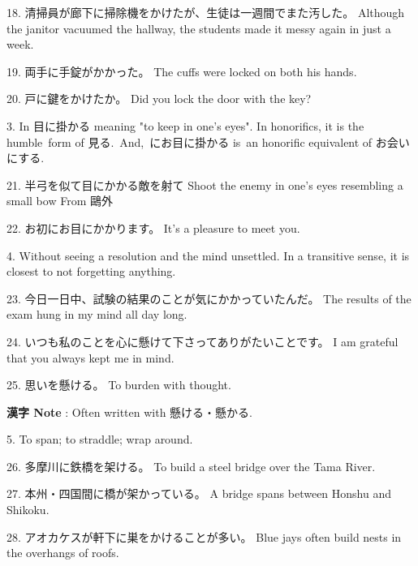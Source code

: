 \par{18. 清掃員が廊下に掃除機をかけたが、生徒は一週間でまた汚した。 \hfill\break
Although the janitor vacuumed the hallway, the students made it messy again in just a week. }

\par{19. 両手に手錠がかかった。 \hfill\break
The cuffs were locked on both his hands. }

\par{20. 戸に鍵をかけたか。 \hfill\break
Did you lock the door with the key? }

\par{3. In 目に掛かる meaning "to keep in one's eyes". In honorifics, it is the humble form of 見る. And, にお目に掛かる is an honorific equivalent of お会いにする. }

\par{21. 半弓を似て目にかかる敵を射て \hfill\break
Shoot the enemy in one's eyes resembling a small bow \hfill\break
From 鷗外 }

\par{22. お初にお目にかかります。 \hfill\break
It's a pleasure to meet you. }

\par{4. Without seeing a resolution and the mind unsettled. In a transitive sense, it is closest to not forgetting anything. }

\par{23. 今日一日中、試験の結果のことが気にかかっていたんだ。 \hfill\break
The results of the exam hung in my mind all day long. }

\par{24. いつも私のことを心に懸けて下さってありがたいことです。 \hfill\break
I am grateful that you always kept me in mind. }

\par{25. 思いを懸ける。 \hfill\break
To burden with thought. }

\par{\textbf{漢字 Note }: Often written with 懸ける・懸かる. }

\par{5. To span; to straddle; wrap around. }

\par{26. 多摩川に鉄橋を架ける。 \hfill\break
To build a steel bridge over the Tama River. }

\par{27. 本州・四国間に橋が架かっている。 \hfill\break
A bridge spans between Honshu and Shikoku. }

\par{28. アオカケスが軒下に巣をかけることが多い。 \hfill\break
Blue jays often build nests in the overhangs of roofs. }

